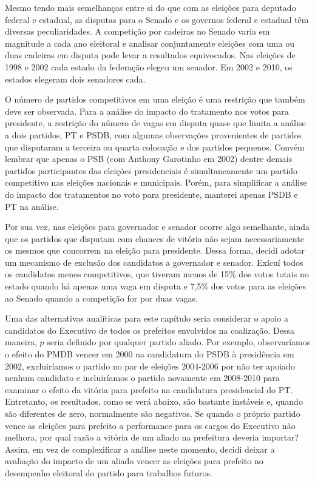 Mesmo tendo mais semelhanças entre si do que com as eleições para deputado federal e estadual, as disputas para o Senado e os governos federal e estadual têm diversas peculiaridades. A competição por cadeiras no Senado varia em magnitude a cada ano eleitoral e analisar conjuntamente eleições com uma ou duas cadeiras em disputa pode levar a resultados equivocados. Nas eleições de 1998 e 2002 cada estado da federação elegeu um senador. Em 2002 e 2010, os estados elegeram dois senadores cada.

O número de partidos competitivos em uma eleição é uma restrição que também deve ser observada. Para a análise do impacto do tratamento nos votos para presidente, a restrição do número de vagas em disputa quase que limita a análise a dois partidos, PT e PSDB, com algumas observações provenientes de partidos que disputaram a terceira ou quarta colocação e dos partidos pequenos. Convém lembrar que apenas o PSB (com Anthony Garotinho em 2002) dentre demais partidos participantes das eleições presidenciais é simultaneamente um partido competitivo nas eleições nacionais e municipais. Porém, para simplificar a análise do impacto dos tratamentos no voto para presidente, manterei apenas PSDB e PT na análise.

Por sua vez, nas eleições para governador e senador ocorre algo semelhante, ainda que os partidos que disputam com chances de vitória não sejam necessariamente os mesmos que concorrem na eleição para presidente. Dessa forma, decidi adotar um mecanismo de exclusão dos candidatos a governador e senador. Exlcuí todos os candidatos menos competitivos, que tiveram menos de 15\% dos votos totais no estado quando há apenas uma vaga em disputa e 7,5\% dos votos para as eleições ao Senado quando a competição for por duas vagas.

Uma das alternativas analíticas para este capítulo seria considerar o apoio a candidatos do Executivo de todos os prefeitos envolvidos na coalização. Dessa maneira, $p$ seria definido por qualquer partido aliado. Por exemplo, observaríamos o efeito do PMDB vencer em 2000 na candidatura do PSDB à presidência em 2002, excluiríamos o partido no par de eleições 2004-2006 por não ter apoiado nenhum candidato e incluiríamos o partido novamente em 2008-2010 para examinar o efeito da vitória para prefeito na candidatura presidencial do PT. Entretanto, os resultados, como se verá abaixo, são bastante instáveis e, quando são diferentes de zero, normalmente são negativos. Se quando o próprio partido vence as eleições para prefeito a performance para os cargos do Executivo não melhora, por qual razão a vitória de um aliado na prefeitura deveria importar? Assim, em vez de complexificar a análise neste momento, decidi deixar a avaliação do impacto de um aliado vencer as eleições para prefeito no desempenho eleitoral do partido para trabalhos futuros.

